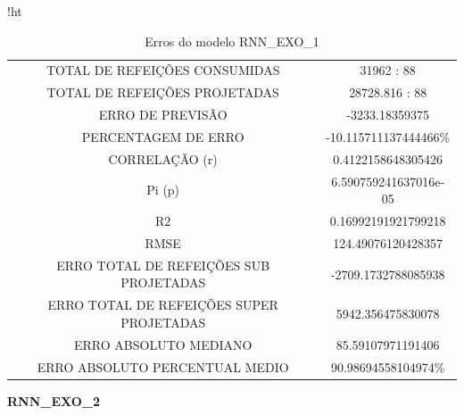 \documentclass[	12pt, Times, openright, twoside, a4paper, english, brazil]{abntex2}
\begin{document}
                
                 \begin{table}{!ht}
                \centering
                \caption{Erros do modelo  RNN\_EXO\_1 }
                    \begin{tabular}{|c|c|}
                    \rowcolor{gray!50}
                    \hline
                \multicolumn{2}{c}{RNN\_EXO\_1:} \\
                \hline
                TOTAL DE REFEIÇÕES CONSUMIDAS & 31962 : 88  \\
                TOTAL DE REFEIÇÕES PROJETADAS & 28728.816 : 88  \\
                ERRO DE PREVISÃO & -3233.18359375 \\
                PERCENTAGEM DE ERRO & -10.115711137444466\%  \\
                CORRELAÇÃO (r) & 0.4122158648305426 \\ Pi (p) & 6.590759241637016e-05\\ R2 & 0.16992191921799218\\
                RMSE & 124.49076120428357\\
                ERRO TOTAL DE REFEIÇÕES SUB PROJETADAS & -2709.1732788085938\\
                ERRO TOTAL DE REFEIÇÕES SUPER PROJETADAS & 5942.356475830078\\
                ERRO ABSOLUTO MEDIANO & 85.59107971191406\\
                ERRO ABSOLUTO PERCENTUAL MEDIO & 90.98694558104974\% \\ \hline \end{tabular} \end{table}
                
              \newpage  
              \textbf{RNN\_EXO\_2}
                \begin{figure}[H]
                \end{figure}
\end{document}
